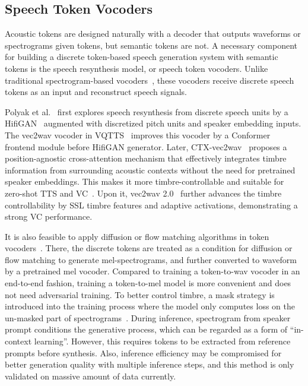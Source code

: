 

\subsection{Speech Token Vocoders}
\label{sec:vocoder}
Acoustic tokens are designed naturally with a decoder that outputs waveforms or spectrograms given tokens, but semantic tokens are not.
A necessary component for building a discrete token-based speech generation system with semantic tokens is the speech resynthesis model, or speech token vocoders.
Unlike traditional spectrogram-based vocoders~\cite{kong2020hifigan}, these vocoders receive discrete speech tokens as an input and reconstruct speech signals.

Polyak et al.~\cite{polyak21} first explores speech resynthesis from discrete speech units by a HifiGAN~\cite{kong2020hifigan} augmented with discretized pitch units and speaker embedding inputs.
\IEEEpubidadjcol
The vec2wav vocoder in VQTTS~\cite{VQTTS} improves this vocoder by a Conformer~\cite{conformer} frontend module before HifiGAN generator.
Later, CTX-vec2wav~\cite{du2024unicats} proposes a position-agnostic cross-attention mechanism that effectively integrates timbre information from surrounding acoustic contexts without the need for pretrained speaker embeddings.
This makes it more timbre-controllable and suitable for zero-shot TTS and VC~\cite{li2024sef}.
Upon it, vec2wav 2.0~\cite{guo2024vec2wav} further advances the timbre controllability by SSL timbre features and adaptive activations, demonstrating a strong VC performance.

It is also feasible to apply diffusion or flow matching algorithms in token vocoders~\cite{tortoise,seedtts,du2024cosyvoice}.
There, the discrete tokens are treated as a condition for diffusion or flow matching to generate mel-spectrograms, and further converted to waveform by a pretrained mel vocoder.
Compared to training a token-to-wav vocoder in an end-to-end fashion, training a token-to-mel model is more convenient and does not need adversarial training. 
To better control timbre, a mask strategy is introduced into the training process where the model only computes loss on the un-masked part of spectrograms~\cite{du2024cosyvoice}.
During inference, spectrogram from speaker prompt conditions the generative process, which can be regarded as a form of ``in-context learning''.
However, this requires tokens to be extracted from reference prompts before synthesis.
Also, inference efficiency may be compromised for better generation quality with multiple inference steps, and this method is only validated on massive amount of data currently.
